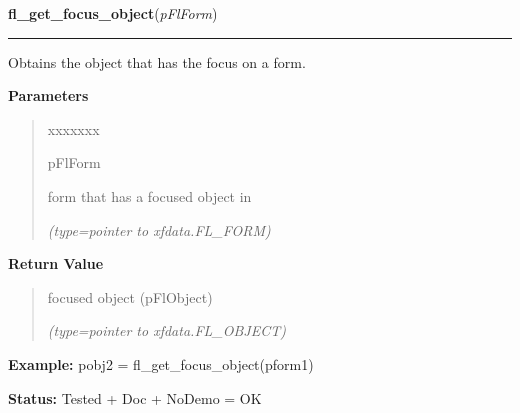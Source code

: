 \hspace{.8\funcindent}\begin{boxedminipage}{\funcwidth}

    \raggedright \textbf{fl\_get\_focus\_object}(\textit{pFlForm})

    \vspace{-1.5ex}

    \rule{\textwidth}{0.5\fboxrule}
\setlength{\parskip}{2ex}
    Obtains the object that has the focus on a form.

\setlength{\parskip}{1ex}
      \textbf{Parameters}
      \vspace{-1ex}

      \begin{quote}
        \begin{Ventry}{xxxxxxx}

          \item[pFlForm]

          form that has a focused object in

            {\it (type=pointer to xfdata.FL\_FORM)}

        \end{Ventry}

      \end{quote}

      \textbf{Return Value}
    \vspace{-1ex}

      \begin{quote}
      focused object (pFlObject)

      {\it (type=pointer to xfdata.FL\_OBJECT)}

      \end{quote}

\textbf{Example:} pobj2 = fl\_get\_focus\_object(pform1)



\textbf{Status:} Tested + Doc + NoDemo = OK



    \end{boxedminipage}

    \label{xformslib:flbasic:fl_reset_focus_object}

    \vspace{0.5ex}

